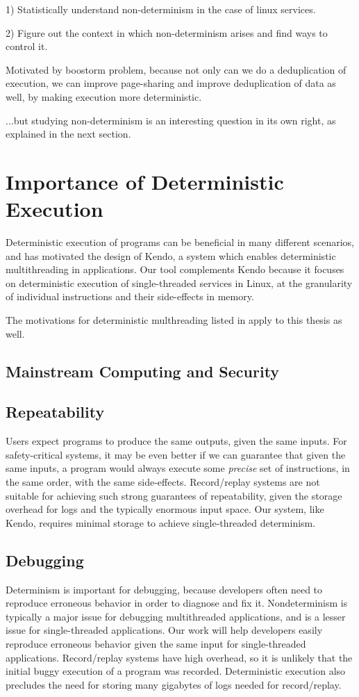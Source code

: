 1) Statistically understand non-determinism 
in the case of linux services.

2) Figure out the context in which non-determinism
arises and find ways to control it.

Motivated by boostorm problem, because not only can we
do a deduplication of execution, we can improve
page-sharing and improve deduplication of data as well,
by making execution more deterministic.

...but studying non-determinism is an interesting question in its
own right, as explained in the next section.

\section{Importance of Deterministic Execution}\label{ch1:whydeterminism}

Deterministic execution of programs can be beneficial in many
different scenarios, and has motivated the design of Kendo,
a system which enables deterministic multithreading
in applications\cite{}. Our tool complements Kendo because 
it focuses on deterministic execution of single-threaded services in Linux,
at the granularity of individual instructions and their side-effects in
memory.

The motivations for deterministic multhreading listed in
\cite{} apply to this thesis as well.

\subsection{Mainstream Computing and Security}


\subsection{Repeatability}
Users expect programs to produce the same outputs, given the same
inputs. For safety-critical systems, it may
be even better if we can guarantee that given the same inputs,
a program would always execute some {\em precise} 
set of instructions, in the same order, with
the same side-effects. Record/replay systems are not suitable for 
achieving such strong guarantees of repeatability, given the storage
overhead for logs and the typically enormous input space. 
Our system, like Kendo, requires minimal storage to achieve
single-threaded determinism. 

\subsection{Debugging}
Determinism is important for debugging, because developers
often need to reproduce erroneous behavior in
order to diagnose and fix it. Nondeterminism is typically
a major issue for debugging multithreaded applications,
and is a lesser issue for single-threaded
applications. Our work will help developers
easily reproduce erroneous behavior given
the same input for single-threaded applications. 
Record/replay systems have high overhead, so it is unlikely
that the initial buggy execution of a program was recorded.
Deterministic execution also precludes the need for storing
many gigabytes of logs needed for record/replay.

